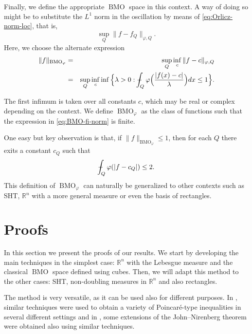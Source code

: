 \documentclass[11pt,a4paper]{amsart}
\theoremstyle{definition}
\theoremstyle{remark}
\numberwithin{equation}{section}
\DeclareMathOperator{\BMO}{BMO}
\def\R{{\mathbb R}}
\newcommand{\RN }{\mathbb R^n}
\def\Xint#1{\mathchoice
  {\XXint\displaystyle\textstyle{#1}}%
  {\XXint\textstyle\scriptstyle{#1}}%
  {\XXint\scriptstyle\scriptscriptstyle{#1}}%
  {\XXint\scriptscriptstyle\scriptscriptstyle{#1}}%
  \!\int}
\def\XXint#1#2#3{{\setbox0=\hbox{$#1{#2#3}{\int}$}
    \vcenter{\hbox{$#2#3$}}\kern-.5\wd0}}
\def\avgint{\Xint-}
\numberwithin{equation}{section}
\begin{document}
Finally, we define the appropriate $\BMO$ space in this context. A way of doing so might be to substitute the $L^1$ norm in the oscillation by  means of \eqref{eq:Orlicz-norm-loc}, that is,
%
\[ \sup_Q \|f-f_Q\|_{\varphi,Q}.\]
%
%
%
Here, we choose the alternate expression
%
\begin{eqnarray}\label{eq:BMO-fi-norm}
\|f\|_{\BMO_\varphi} & = &  \sup_Q \inf_{c} \|f-c\|_{\varphi,Q} \\
& = & \sup_Q \inf_c \inf\Big\lbrace \lambda >0: \avgint_Q \varphi\Big( \frac{|f(x)-c|}{\lambda}\Big) dx \leq 1 \Big \rbrace.\nonumber
\end{eqnarray}
%


The first infimum is taken over all constants $c$, which may be real or complex depending on the context.
We define $\BMO_\varphi$ as the class of functions such that the expression in \eqref{eq:BMO-fi-norm} is finite. 



One easy but key observation is that, if $\|f\|_{\BMO_\varphi}\leq 1$, then for each $Q$ there exits a constant $c_Q$ such that
%
\begin{equation*}%
\avgint_Q \varphi(|f-c_Q|) \leq 2.
\end{equation*}
%
This definition of $\BMO_\varphi$ can naturally be generalized to other contexts such as SHT, $\R^n$ with a more general measure or even the basis of rectangles.










\section{Proofs} \label{sec:proofs}


In this section we present the proofs of our results. We start by developing the main techniques in the simplest case: $\RN$ with the Lebesgue measure and the classical $\BMO$ space defined using cubes. Then, we will adapt this method to the other cases: SHT, non-doubling measures in $\RN$ and also rectangles. 

The method is very versatile, as it can be used also for different purposes. In \cite{PR-Poincare}, similar techniques were used to obtain a variety of Poincar\'e-type inequalities in several different settings and in \cite{CP-extension}, some extensions of the John--Nirenberg theorem were obtained also using similar techniques.
\end{document}

